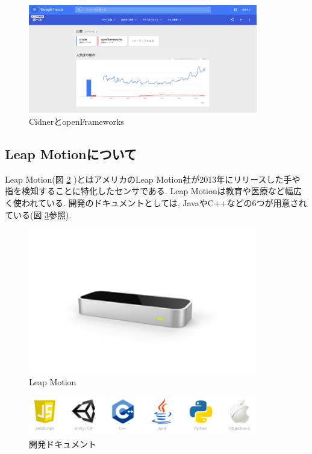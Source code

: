\documentclass{funthesis}
\begin{document}
\begin{figure}[H]
 \begin{center}
  \includegraphics[width=100mm]{./img/api.png}
 \end{center}
 \caption{CidnerとopenFrameworks}
 \label{API}
\end{figure}


\subsection{Leap Motionについて}
Leap Motion(図 \ref{LeapMotion} )とはアメリカのLeap Motion社が2013年にリリースした手や指を検知することに特化したセンサである. Leap Motionは教育や医療など幅広く使われている. 開発のドキュメントとしては, JavaやC++などの6つが用意されている(図 \ref{Leapdoc}参照).



\begin{figure}[H]
 \begin{center}
  \includegraphics[width=100mm]{./img/LeapMotion.png}
 \end{center}
 \caption{Leap Motion}
 \label{LeapMotion}
\end{figure}

\begin{figure}[H]
 \begin{center}
  \includegraphics[width=100mm]{./img/Leapdoc.png}
 \end{center}
 \caption{開発ドキュメント}
 \label{Leapdoc}
\end{figure}
\end{document}
